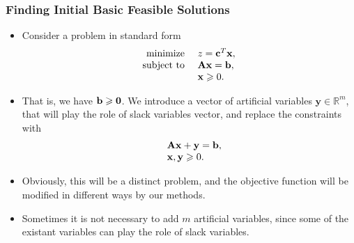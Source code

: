 \documentclass{beamer}
\theoremstyle{plain}
\let\ge\geqslant
\def\x{{\mathrm x}}
\def\y{{\mathrm y}}
\def\AA{{\bf \mathrm\bf A}}
\def\bb{{\bf \mathrm \bf b}}
\def\cc{{\bf \mathrm \bf c}}
\def\R{{\mathbb R}}
\def\x{{\mathbf x}}
\def\y{{\mathbf y}}
\def\zero{{\mathbf 0}}
\begin{document}
\begin{frame}\frametitle{Finding Initial Basic Feasible Solutions}
\justifying

\begin{itemize}
\justifying

\item Consider a problem in standard form
\begin{equation}
\label{eq15}
\begin{array}{rl}
\textrm{minimize } & z = \cc^T\x, \\
\textrm{subject to } & \AA\x = \bb,\\
& \x \ge 0. \end{array}
\end{equation}

\item That is, we have $ \bb \ge \zero $. We introduce a vector of artificial variables $ \y \in \R^m $, that will play the role of slack variables vector, and replace the constraints with
\begin{equation}
\label{eq16}
\begin{array}{rl}
& \AA\x + \y = \bb,\\
& \x, \y \ge 0. \end{array}
\end{equation}

\item Obviously, this will be a distinct problem, and the objective function will be modified in different ways by our methods.

\item Sometimes it is not necessary to add $ m $ artificial variables, since some of the existant variables can play the role of slack variables.

\end{itemize}

\end{frame}
\end{document}
